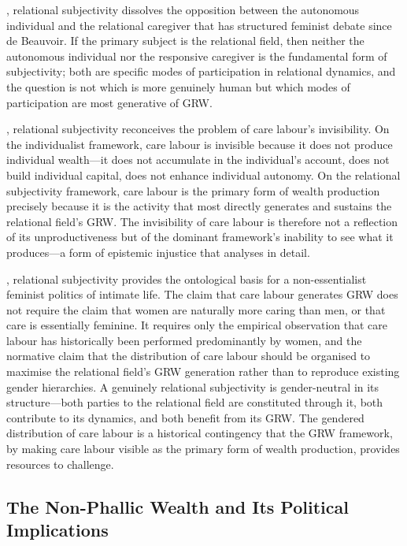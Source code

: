 , relational subjectivity dissolves the opposition between the autonomous individual and the relational caregiver that has structured feminist debate since de Beauvoir. If the primary subject is the relational field, then neither the autonomous individual nor the responsive caregiver is the fundamental form of subjectivity; both are specific modes of participation in relational dynamics, and the question is not which is more genuinely human but which modes of participation are most generative of GRW.

, relational subjectivity reconceives the problem of care labour's invisibility. On the individualist framework, care labour is invisible because it does not produce individual wealth---it does not accumulate in the individual's account, does not build individual capital, does not enhance individual autonomy. On the relational subjectivity framework, care labour is the primary form of wealth production precisely because it is the activity that most directly generates and sustains the relational field's GRW. The invisibility of care labour is therefore not a reflection of its unproductiveness but of the dominant framework's inability to see what it produces---a form of epistemic injustice that  analyses in detail.

, relational subjectivity provides the ontological basis for a non-essentialist feminist politics of intimate life. The claim that care labour generates GRW does not require the claim that women are naturally more caring than men, or that care is essentially feminine. It requires only the empirical observation that care labour has historically been performed predominantly by women, and the normative claim that the distribution of care labour should be organised to maximise the relational field's GRW generation rather than to reproduce existing gender hierarchies. A genuinely relational subjectivity is gender-neutral in its structure---both parties to the relational field are constituted through it, both contribute to its dynamics, and both benefit from its GRW. The gendered distribution of care labour is a historical contingency that the GRW framework, by making care labour visible as the primary form of wealth production, provides resources to challenge.

\subsection{The Non-Phallic Wealth and Its Political Implications}
\label{p15:subsec:nonphallic}

